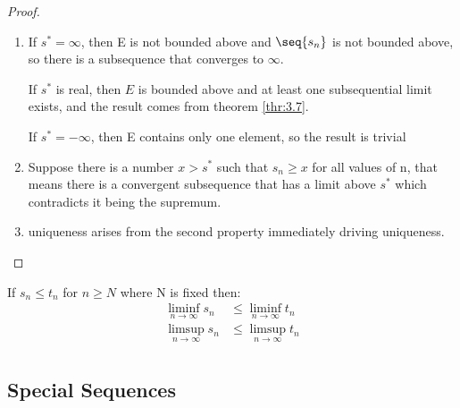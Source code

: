 \documentclass[12pt, letterpaper]{paper}
\begin{document}
\begin{proof}
  \begin{enumerate}
  \item If $s^{*} = \infty$, then E is not bounded above and
    $\seq{s_n}$ is not bounded above, so there is a subsequence that
    converges to $\infty$.

    If $s^{*}$ is real, then $E$ is bounded above and at least one
    subsequential limit exists, and the result comes from theorem
    \ref{thr:3.7}.

    If $s^{*} = -\infty$, then E contains only one element, so the
    result is trivial
  \item Suppose there is a number $x > s^{*}$ such that $s_n \geq x$
    for all values of n, that means there is a convergent subsequence
    that has a limit above $s^{*}$ which contradicts it being the
    supremum.
  \item uniqueness arises from the second property immediately driving
    uniqueness.
  \end{enumerate}
\end{proof}

\begin{theorem}
  \label{thr:3.19}
  If $s_n \leq t_n$ for $n \geq N$ where N is fixed then:
  \begin{align*}
    \liminf_{n\to \infty}s_n &\leq \liminf_{n\to \infty}t_n\\
    \limsup_{n\to\infty}s_n &\leq \limsup_{n\to \infty}t_n\\
  \end{align*}
\end{theorem}

\subsection*{Special Sequences}
\end{document}
